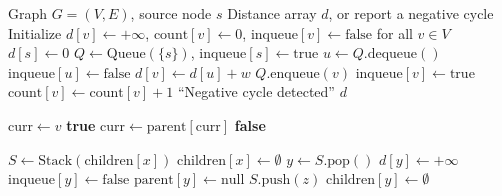 \documentclass[a4paper]{article}
\theoremstyle{definition}
\begin{document}
\begin{algorithm}[H]
\caption{Standard SPFA}
\label{alg:spfa-standard}
\begin{algorithmic}[1]
\Require Graph $G = (V, E)$, source node $s$
\Ensure Distance array $d$, or report a negative cycle
\State Initialize $d[v] \gets +\infty$, $\text{count}[v] \gets 0$, $\text{inqueue}[v] \gets \text{false}$ for all $v \in V$
\State $d[s] \gets 0$
\State $Q \gets \text{Queue}(\{s\})$, $\text{inqueue}[s] \gets \text{true}$
    \State $u \gets Q.\text{dequeue}()$
    \State $\text{inqueue}[u] \gets \text{false}$
            \State $d[v] \gets d[u] + w$
                \State $Q.\text{enqueue}(v)$
                \State $\text{inqueue}[v] \gets \text{true}$
                \State $\text{count}[v] \gets \text{count}[v] + 1$
                    \State \Return ``Negative cycle detected''
                \EndIf
            \EndIf
        \EndIf
    \EndFor
\EndWhile
\State \Return $d$
\end{algorithmic}
\end{algorithm}

\begin{algorithm}[H]
\caption{Auxiliary Procedure: \textsc{Is-In-Subtree}$(u, v)$}
\label{alg:is-in-subtree}
\begin{algorithmic}[1]
    \State $\text{curr} \gets v$
            \State \Return \textbf{true}
        \EndIf
        \State $\text{curr} \gets \text{parent}[\text{curr}]$
    \EndWhile
    \State \Return \textbf{false}
\EndFunction
\end{algorithmic}
\end{algorithm}

\begin{algorithm}[H]
\caption{Auxiliary Procedure: \textsc{Delete-Subtree}$(x)$}
\label{alg:delete-subtree}
\begin{algorithmic}[1]
    \State $S \gets \text{Stack}(\text{children}[x])$
    \State $\text{children}[x] \gets \emptyset$
        \State $y \gets S.\text{pop}()$
        \State $d[y] \gets +\infty$
        \State $\text{inqueue}[y] \gets \text{false}$
        \State $\text{parent}[y] \gets \text{null}$
            \State $S.\text{push}(z)$
        \EndFor
        \State $\text{children}[y] \gets \emptyset$
    \EndWhile
\EndFunction
\end{algorithmic}
\end{algorithm}
\end{document}
